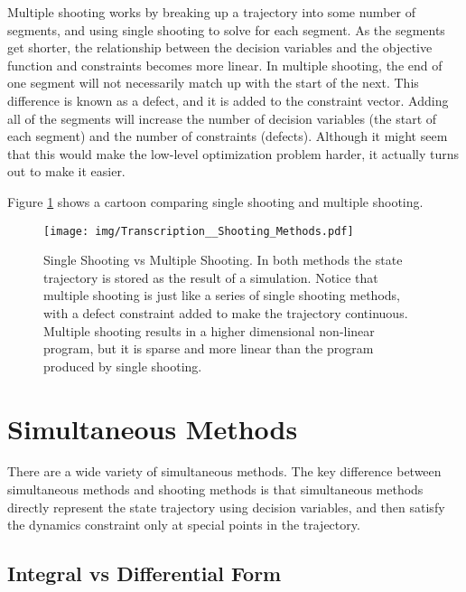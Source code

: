 \par Multiple shooting works by breaking up a trajectory into some number of segments, and using single shooting to solve for each segment. As the segments get shorter, the relationship between the decision variables and the objective function and constraints becomes more linear. In multiple shooting, the end of one segment will not necessarily match up with the start of the next. This difference is known as a defect, and it is added to the constraint vector. Adding all of the segments will increase the number of decision variables (the start of each segment) and the number of constraints (defects). Although it might seem that this would make the low-level optimization problem harder, it actually turns out to make it easier.

\par Figure \ref{fig:Shooting_Methods} shows a cartoon comparing single shooting and multiple shooting.

\begin{figure}
\centering
\texttt{[image: img/Transcription\_\_Shooting\_Methods.pdf]}
\caption{Single Shooting vs Multiple Shooting. In both methods the state trajectory is stored as the result of a simulation. Notice that multiple shooting is just like a series of single shooting methods, with a defect constraint added to make the trajectory continuous. Multiple shooting results in a higher dimensional non-linear program, but it is sparse and more linear than the program produced by single shooting.}
\label{fig:Shooting_Methods}
\end{figure}



\section{Simultaneous Methods}

There are a wide variety of simultaneous methods. The key difference between simultaneous methods and shooting methods is that simultaneous methods directly represent the state trajectory using decision variables, and then satisfy the dynamics constraint only at special points in the trajectory.

\subsection{Integral vs Differential Form}

